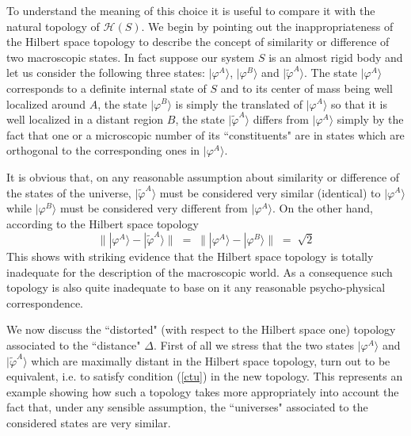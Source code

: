 \documentclass[12pt]{article}
\begin{document}
To understand the meaning of this choice it is useful to compare
it with the natural topology of ${\mathcal H}(S)$. We begin by
pointing out the inappropriateness of the Hilbert space topology
to describe the concept of similarity or difference of two
macroscopic states. In fact suppose our system $S$ is an almost
rigid body and let us consider the following three states:
$|\varphi^{A}\rangle$, $|\varphi^{B}\rangle$ and
$|\tilde\varphi^{A}\rangle$. The state $|\varphi^{A}\rangle$
corresponds to a definite internal state of $S$ and to its center
of mass being well localized around $A$, the state
$|\varphi^{B}\rangle$ is simply the translated of
$|\varphi^{A}\rangle$ so that it is well localized in a distant
region $B$, the state $|\tilde\varphi^{A}\rangle$ differs from
$|\varphi^{A}\rangle$ simply by the fact that one or a microscopic
number of its ``constituents" are in states which are orthogonal
to the corresponding ones in $|\varphi^{A}\rangle$.

It is obvious that, on any reasonable assumption about similarity
or difference of the states of the universe,
$|\tilde\varphi^{A}\rangle$ must be considered very similar
(identical) to $|\varphi^{A}\rangle$ while $|\varphi^{B}\rangle$
must be considered very different from $|\varphi^{A}\rangle$. On
the other hand, according to the Hilbert space topology
\begin{equation}
\| |\varphi^{A}\rangle - |\tilde\varphi^{A}\rangle \| \; = \; \|
|\varphi^{A}\rangle - |\varphi^{B}\rangle \| \; = \; \sqrt{2}
\end{equation}
This shows with striking evidence that the Hilbert space topology
is totally inadequate for the description of the macroscopic
world. As a consequence such topology is also quite inadequate to
base on it any reasonable psycho-physical correspondence.

We now discuss the ``distorted" (with respect to the Hilbert space
one) topology associated to the ``distance" $\Delta$. First of all
we stress that the two states $|\varphi^{A}\rangle$ and
$|\tilde\varphi^{A}\rangle$ which are maximally distant in the
Hilbert space topology, turn out to be equivalent, i.e. to satisfy
condition (\ref{ctu}) in the new topology. This represents an
example showing how such a topology takes more appropriately into
account the fact that, under any sensible assumption, the
``universes" associated to the considered states are very similar.
\end{document}
